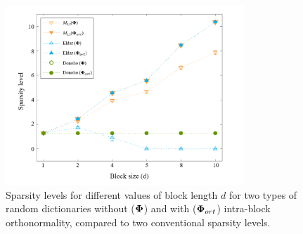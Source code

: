 \begin{figure}[!b]
\centering
\includegraphics[width=0.8\textwidth,keepaspectratio]{images/SL_1Inf_Opt_Eldar_Donoho.png}
\centering
\caption{Sparsity levels for different values of block length $d$ for two types of random dictionaries without ($\boldsymbol{\Phi}$) and with ($\boldsymbol{\Phi}_{ort}$) intra-block orthonormality, compared to two conventional sparsity levels.}
\label{fig:SL_1Inf_Opt_Eldar_Donoho}
\end{figure}